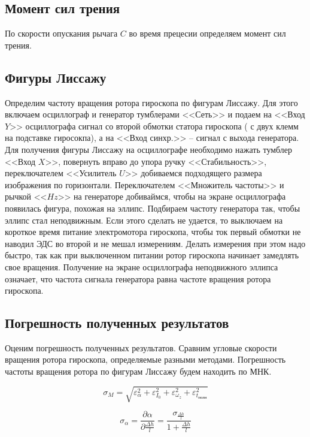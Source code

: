 \documentclass[a4paper,12pt]{article}
\begin{document}
\subsection{Момент сил трения}
По скорости опускания рычага $C$ во время прецесии определяем момент сил трения.

\subsection{Фигуры Лиссажу}
Определим частоту вращения ротора гироскопа по фигурам Лиссажу. Для этого включаем осциллограф и генератор тумблерами <<Сеть>> и подаем на <<Вход $Y$>> осциллографа сигнал со второй обмотки статора гироскопа ( с двух клемм на подставке гиросокпа), а на <<Вход синхр.>> -- сигнал с выхода генератора. Для получения фигуры Лиссажу на осциллографе необходимо нажать тумблер <<Вход $X$>>, повернуть вправо до упора ручку <<Стабильность>>, переключателем <<Усилитель $U$>> добиваемся подходящего размера изображения по горизонтали. Переключателем <<Множитель частоты>> и рычкой <<$Hz$>> на генераторе добиваймся, чтобы на экране осциллографа появилась фигура, похожая на эллипс.  Подбираем частоту генератора так, чтобы эллипс стал неподвижным. Если этого сделать не удается, то выключаем на короткое время питание электромотора гироскопа, чтобы ток первый обмотки не наводил ЭДС во второй и не мешал измерениям. Делать измерения при этом надо быстро, так как при выключенном питании ротор гироскопа начинает замедлять свое вращения. Получение на экране осциллографа неподвижного эллипса означает, что частота сигнала генератора равна частоте вращения ротора гироскопа.

\subsection{Погрешность полученных результатов}
Оценим погрешность полученных результатов. Сравним угловые скорости вращения ротора гироскопа, определяемые разными методами. Погрешность частоты вращения ротора по фигурам Лиссажу будем находить по МНК.

\begin{equation}
	\sigma_{M} = \sqrt{\varepsilon_{\alpha}^{2} + \varepsilon_{I_{0}}^{2} + \varepsilon_{\omega_{z}}^{2} + \varepsilon_{t_{\text{полн}}}^{2}}
\end{equation}

\begin{equation}
	\sigma_{\alpha} = \frac{\partial \alpha}{\partial \frac{\Delta h}{l}} = \frac{\sigma_{\frac{\Delta h}{l}}}{1 + \frac{\Delta h}{l}}
\end{equation}
\end{document}
